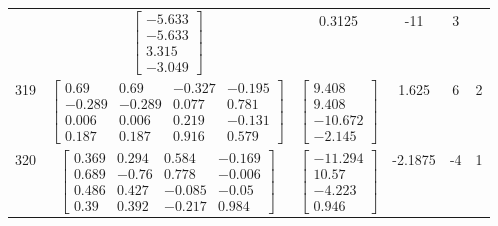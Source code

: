 \documentclass[a4paper,12pt]{article}
\begin{document}
\begin{tabular}{c c c c c c}
&
$\begin{bmatrix} -5.633 \\ -5.633 \\ 3.315 \\ -3.049 \end{bmatrix}$
&
0.3125
&
-11
&
3
\\
319
&
$\begin{bmatrix} 0.69 & 0.69 & -0.327 & -0.195 \\ -0.289 & -0.289 & 0.077 & 0.781 \\ 0.006 & 0.006 & 0.219 & -0.131 \\ 0.187 & 0.187 & 0.916 & 0.579 \end{bmatrix}$
&
$\begin{bmatrix} 9.408 \\ 9.408 \\ -10.672 \\ -2.145 \end{bmatrix}$
&
1.625
&
6
&
2
\\
320
&
$\begin{bmatrix} 0.369 & 0.294 & 0.584 & -0.169 \\ 0.689 & -0.76 & 0.778 & -0.006 \\ 0.486 & 0.427 & -0.085 & -0.05 \\ 0.39 & 0.392 & -0.217 & 0.984 \end{bmatrix}$
&
$\begin{bmatrix} -11.294 \\ 10.57 \\ -4.223 \\ 0.946 \end{bmatrix}$
&
-2.1875
&
-4
&
1
\\
\end{tabular} \egroup \newpage
\end{document}
